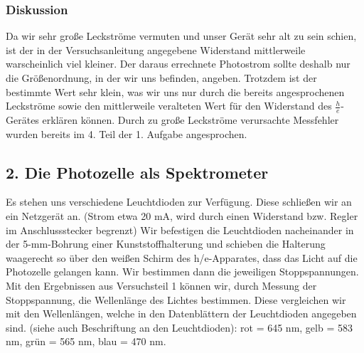 \documentclass[12px]{scrartcl}
\begin{document}
\subsubsection{Diskussion}
Da wir sehr große Leckströme vermuten und unser Gerät sehr alt zu sein schien, ist der in der Versuchsanleitung angegebene Widerstand  mittlerweile warscheinlich viel kleiner. Der daraus errechnete Photostrom sollte deshalb nur die Größenordnung, in der wir uns befinden, angeben. Trotzdem ist der bestimmte Wert sehr klein, was wir uns nur durch die bereits angesprochenen Leckströme sowie den mittlerweile veralteten Wert für den Widerstand des $\frac{h}{e}$-Gerätes erklären können. Durch zu große Leckströme verursachte Messfehler wurden bereits im 4. Teil der 1. Aufgabe angesprochen.


\subsection{2. Die Photozelle als Spektrometer}
Es stehen uns verschiedene Leuchtdioden zur Verfügung. Diese schließen wir an ein Netzgerät an.
(Strom etwa 20 mA, wird durch einen Widerstand bzw. Regler im Anschlussstecker begrenzt)
Wir befestigen die Leuchtdioden nacheinander in der 5-mm-Bohrung einer Kunststoffhalterung und schieben die Halterung waagerecht so über den weißen Schirm des h/e-Apparates, dass das Licht auf die Photozelle gelangen kann. Wir bestimmen dann die jeweiligen Stoppspannungen.
Mit den Ergebnissen aus Versuchsteil 1 können wir, durch Messung der Stoppspannung, die Wellenlänge des Lichtes bestimmen. Diese vergleichen wir mit den Wellenlängen, welche in den Datenblättern der Leuchtdioden angegeben sind. (siehe auch Beschriftung an den Leuchtdioden):
rot = 645 nm, gelb = 583 nm, grün = 565 nm, blau = 470 nm.
\end{document}
